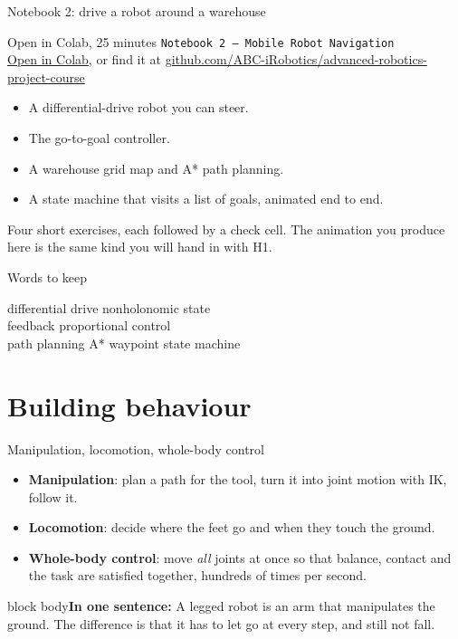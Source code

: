\documentclass[aspectratio=169]{beamer}
\newcommand{\takeaway}[1]{\vspace{2mm}\begin{beamercolorbox}[rounded=true,sep=4pt,wd=\textwidth]{block body}\footnotesize\textbf{In one sentence:} #1\end{beamercolorbox}}
\newcommand{\wordsframe}[1]{\begin{frame}{Words to keep}\begin{center}\Large #1\end{center}\end{frame}}
\begin{document}
\begin{frame}{Notebook 2: drive a robot around a warehouse}
	\begin{block}{Open in Colab, 25 minutes}
		\texttt{Notebook 2 -- Mobile Robot Navigation}\\ {\scriptsize \href{https://colab.research.google.com/github/ABC-iRobotics/advanced-robotics-project-course/blob/main/week01_classical_robotics/notebooks/nb2_mobile_robot_STUDENT.ipynb}{\textcolor{blue!70!black}{Open in Colab}}, or find it at \href{https://github.com/ABC-iRobotics/advanced-robotics-project-course}{\textcolor{blue!70!black}{github.com/ABC-iRobotics/advanced-robotics-project-course}}}
	\end{block}
	\begin{itemize}
		\item A differential-drive robot you can steer.
		\item The go-to-goal controller.
		\item A warehouse grid map and A* path planning.
		\item A state machine that visits a list of goals, animated end to end.
	\end{itemize}
	Four short exercises, each followed by a check cell. The animation you produce here is the same kind you will hand in with H1.
\end{frame}

\wordsframe{differential drive \quad nonholonomic \quad state \\[3mm] feedback \quad proportional control \\[3mm] path planning \quad A* \quad waypoint \quad state machine}

\section{Building behaviour}

\begin{frame}{Manipulation, locomotion, whole-body control}
	\begin{itemize}
		\item \textbf{Manipulation}: plan a path for the tool, turn it into joint motion with IK, follow it.
		\item \textbf{Locomotion}: decide where the feet go and when they touch the ground.
		\item \textbf{Whole-body control}: move \emph{all} joints at once so that balance, contact and the task are satisfied together, hundreds of times per second.
	\end{itemize}
	\takeaway{A legged robot is an arm that manipulates the ground. The difference is that it has to let go at every step, and still not fall.}
\end{frame}
\end{document}
